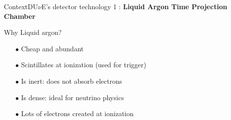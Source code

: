 \documentclass[10pt]{beamer}
\begin{document}
\begin{frame}{Context}{DU$\nu$E's detector technology 1 : \textbf{Liquid Argon Time Projection Chamber}}
\begin{scriptsize}
\begin{minipage}{0.48\textwidth}
    			Why Liquid argon?
    			\begin{itemize}
    				\item[$\bullet$] Cheap and abundant
    				\item[$\bullet$] Scintillates at ionization (used for trigger)
    				\item[$\bullet$] Is inert: does not absorb electrons
    				\item[$\bullet$] Is dense: ideal for neutrino physics
    				\item[$\bullet$] Lots of electrons created at ionization
    			\end{itemize}
    		\end{minipage}
    	\end{scriptsize}
    \end{frame}
    
\end{document}
